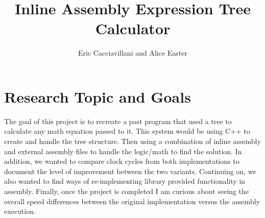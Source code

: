 \documentclass[a4paper,10pt]{article}
\title{Inline Assembly Expression Tree Calculator}
\author{Eric Cacciavillani and Alice Easter}
\begin{document}
\maketitle


\section*{Research Topic and Goals}
\smallskip
The goal of this project is to recreate a past program that used a tree to calculate any math equation passed to it. This system would be using C++ to create and handle the tree structure. Then using a combination of inline assembly and external assembly files to handle the logic/math to find the solution. In addition, we wanted to compare clock cycles from both implementations to document the level of improvement between the two variants. Continuing on, we also wanted to find ways of re-implementing library provided functionality in assembly. Finally, once the project is completed I am curious about seeing the overall speed differences between the original implementation versus the assembly execution.
\end{document}
